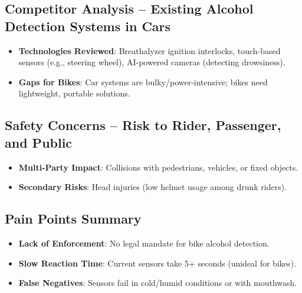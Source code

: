 \documentclass{article}
\begin{document}
\subsection{Competitor Analysis -- Existing Alcohol Detection Systems in Cars}
\begin{itemize}
    \item \textbf{Technologies Reviewed}: Breathalyzer ignition interlocks, touch-based sensors (e.g., steering wheel), AI-powered cameras (detecting drowsiness).
    \item \textbf{Gaps for Bikes}: Car systems are bulky/power-intensive; bikes need lightweight, portable solutions.
\end{itemize}

\subsection{Safety Concerns -- Risk to Rider, Passenger, and Public}
\begin{itemize}
    \item \textbf{Multi-Party Impact}: Collisions with pedestrians, vehicles, or fixed objects.
    \item \textbf{Secondary Risks}: Head injuries (low helmet usage among drunk riders).
\end{itemize}

\subsection{Pain Points Summary}
\begin{itemize}
    \item \textbf{Lack of Enforcement}: No legal mandate for bike alcohol detection.
    \item \textbf{Slow Reaction Time}: Current sensors take 5+ seconds (unideal for bikes).
    \item \textbf{False Negatives}: Sensors fail in cold/humid conditions or with mouthwash.
\end{itemize}

\newpage
\end{document}
